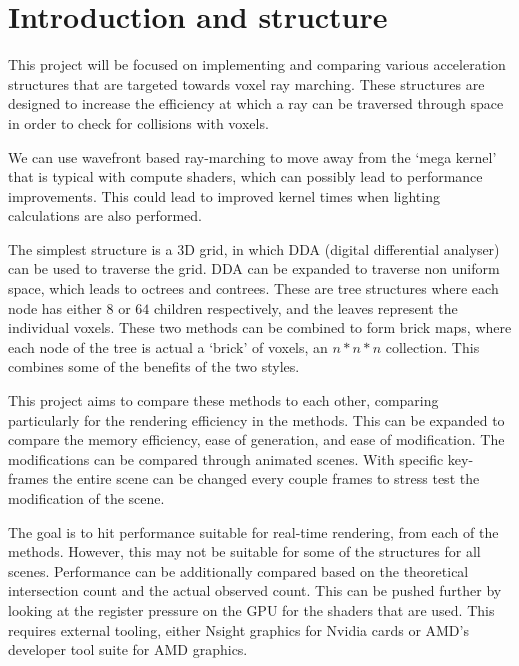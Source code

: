 \section*{Introduction and structure}

This project will be focused on implementing and comparing various
acceleration structures that are targeted towards voxel ray marching.
These structures are designed to increase the efficiency at which a
ray can be traversed through space in order to check for collisions with
voxels.

We can use wavefront based ray-marching to move away from
the `mega kernel' that is typical with compute shaders, which can possibly
lead to performance improvements. This could lead to improved kernel times
when lighting calculations are also performed.

The simplest structure is a 3D grid, in which DDA (digital
differential analyser) can be used to
traverse the grid. DDA can be expanded to traverse non uniform space,
which leads to octrees and contrees. These are tree structures where
each node has either $8$ or $64$ children respectively, and the leaves
represent the individual voxels. These two methods can be combined to
form brick maps, where each node of the tree is actual a `brick' of voxels,
an $n*n*n$ collection. This combines some of the benefits of the two styles.

This project aims to compare these methods to each other, comparing
particularly for the rendering efficiency in the methods. This
can be expanded to compare the memory efficiency, ease of generation,
and ease of modification. The modifications can be compared through
animated scenes. With specific key-frames the entire scene can be changed every
couple frames to stress test the modification of the scene.

The goal is to hit performance suitable for real-time rendering, from each
of the methods. However, this may not be suitable for some of the structures
for all scenes.
Performance can be additionally compared based on the theoretical
intersection count and the actual observed count. This can be
pushed further by looking at the register pressure on the GPU for
the shaders that are used. This requires external tooling, either
Nsight graphics for Nvidia cards or AMD's developer tool suite
for AMD graphics.

